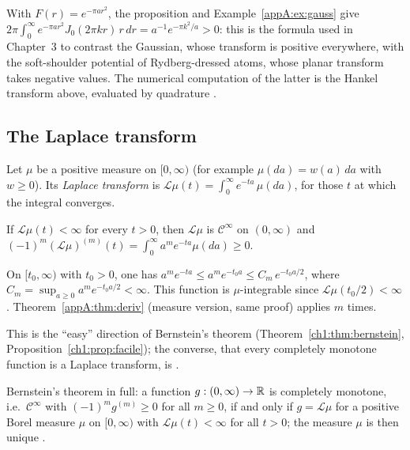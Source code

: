 \begin{remark}
With $F(r)=e^{-\pi ar^2}$, the proposition and Example~\ref{appA:ex:gauss} give
$2\pi\int_0^\infty e^{-\pi ar^2}J_0(2\pi kr)\,r\,dr=a^{-1}e^{-\pi k^2/a}>0$: this is the formula used in
Chapter~3 to contrast the Gaussian, whose transform is positive everywhere, with the soft-shoulder potential of
Rydberg-dressed atoms, whose planar transform takes negative values. The numerical computation of the latter is the
Hankel transform above, evaluated by quadrature \tierX.
\end{remark}

\subsection{The Laplace transform}

\begin{definition}
Let $\mu$ be a positive measure on $[0,\infty)$ (for example $\mu(da)=w(a)\,da$ with $w\ge0$). Its \emph{Laplace
transform} is $\mathcal L\mu(t)=\int_0^\infty e^{-ta}\,\mu(da)$, for those $t$ at which the integral converges.
\end{definition}

\begin{proposition}\label{appA:prop:laplacecm}
If $\mathcal L\mu(t)<\infty$ for every $t>0$, then $\mathcal L\mu$ is $\mathcal C^\infty$ on $(0,\infty)$ and
$(-1)^m(\mathcal L\mu)^{(m)}(t)=\int_0^\infty a^me^{-ta}\mu(da)\ge0$.
\end{proposition}

\begin{humanproof}
On $[t_0,\infty)$ with $t_0>0$, one has $a^me^{-ta}\le a^me^{-t_0a}\le C_m\,e^{-t_0a/2}$, where
$C_m=\sup_{a\ge0}a^me^{-t_0a/2}<\infty$. This function is $\mu$-integrable since $\mathcal L\mu(t_0/2)<\infty$.
Theorem~\ref{appA:thm:deriv} (measure version, same proof) applies $m$ times.
\end{humanproof}
This is the ``easy'' direction of Bernstein's theorem (Theorem~\ref{ch1:thm:bernstein},
Proposition~\ref{ch1:prop:facile}); the converse, that every completely monotone function is a Laplace transform, is
\tierL.

\begin{uniremark}\tierL{} Bernstein's theorem in full: a function $g:(0,\infty)\to\mathbb{R}$ is completely monotone, i.e.\
$\mathcal C^\infty$ with $(-1)^mg^{(m)}\ge0$ for all $m\ge0$, if and only if $g=\mathcal L\mu$ for a positive Borel
measure $\mu$ on $[0,\infty)$ with $\mathcal L\mu(t)<\infty$ for all $t>0$; the measure $\mu$ is then unique
\cite{bernstein,widder}.
\end{uniremark}

